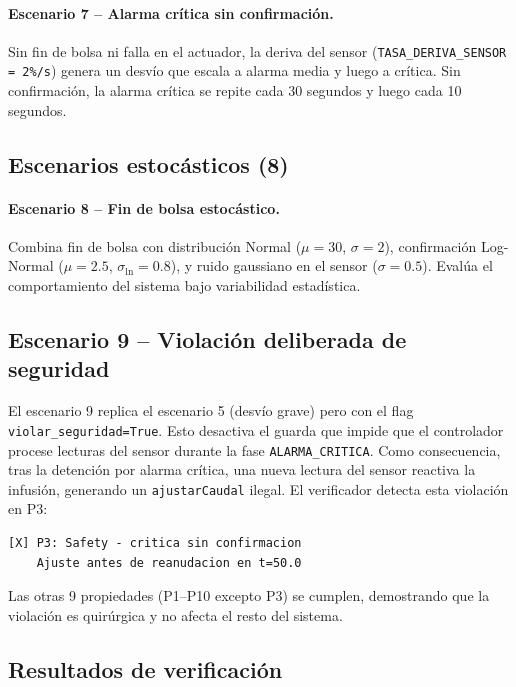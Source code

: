 \documentclass[12pt,a4paper]{article}
\begin{document}
\paragraph{Escenario 7 -- Alarma crítica sin confirmación.} Sin
fin de bolsa ni falla en el actuador, la deriva del sensor
(\texttt{TASA\_DERIVA\_SENSOR = 2\%/s}) genera un desvío que escala
a alarma media y luego a crítica.  Sin confirmación, la alarma
crítica se repite cada 30 segundos y luego cada 10 segundos.

\subsection{Escenarios estocásticos (8)}

\paragraph{Escenario 8 -- Fin de bolsa estocástico.} Combina fin de
bolsa con distribución Normal ($\mu=30$, $\sigma=2$), confirmación
Log-Normal ($\mu=2.5$, $\sigma_{\ln}=0.8$), y ruido gaussiano en el
sensor ($\sigma=0.5$).  Evalúa el comportamiento del sistema bajo
variabilidad estadística.

\subsection{Escenario 9 -- Violación deliberada de seguridad}

El escenario 9 replica el escenario 5 (desvío grave) pero
con el flag \texttt{violar\_seguridad\allowbreak=True}.  Esto
desactiva el guarda que impide que el controlador procese
lecturas del sensor durante la fase \texttt{ALARMA\_CRITICA}.
Como consecuencia, tras la detención por alarma crítica, una
nueva lectura del sensor reactiva la infusión, generando un
\texttt{ajustarCaudal} ilegal.  El verificador detecta esta
violación en P3:

\begin{lstlisting}
[X] P3: Safety - critica sin confirmacion
    Ajuste antes de reanudacion en t=50.0
\end{lstlisting}

Las otras 9 propiedades (P1--P10 excepto P3) se cumplen, demostrando
que la violación es quirúrgica y no afecta el resto del sistema.

\subsection{Resultados de verificación}
\end{document}
